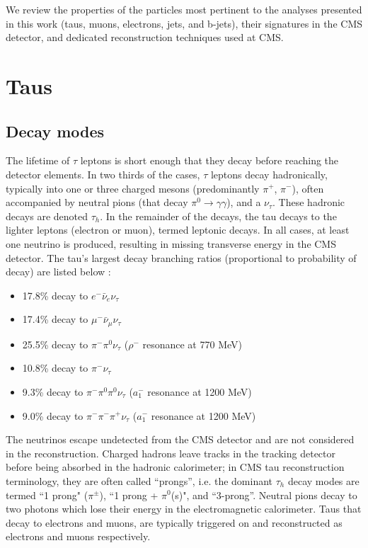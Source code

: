 We review the properties of the particles most pertinent to the analyses presented in this work (taus, muons, electrons, jets, and b-jets), their signatures in the CMS detector, and dedicated reconstruction techniques used at CMS.

\section{Taus}
\subsection{Decay modes}
The lifetime of $\tau$ leptons is short enough that they decay before reaching the detector elements. In two thirds of the cases, $\tau$ leptons decay hadronically, typically into one or three charged mesons (predominantly $\pi^+$, $\pi^-$), often accompanied by neutral pions (that decay $\pi^0 \rightarrow \gamma\gamma$), and a $\nu_{\tau}$. These hadronic decays are denoted $\tau_{h}$. In the remainder of the decays, the tau decays to the lighter leptons (electron or muon), termed leptonic decays. In all cases, at least one neutrino is produced, resulting in missing transverse energy in the CMS detector. The tau's largest decay branching ratios (proportional to probability of decay) are listed below \citep{workman_review_2022}: 
\begin{itemize}
    \item 17.8\% decay to $e^- \bar{\nu}_e \nu_{\tau}$
    \item 17.4\% decay to $\mu^- \bar{\nu}_\mu \nu_{\tau}$
    \item 25.5\% decay to $\pi^- \pi^0 \nu_{\tau}$ ($\rho^-$ resonance at 770 MeV)
    \item 10.8\% decay to $\pi^- \nu_{\tau}$ %
    \item 9.3\% decay to $\pi^- \pi^0 \pi^0 \nu_{\tau}$  ($a_1^-$ resonance at 1200 MeV)
    \item 9.0\% decay to $\pi^- \pi^- \pi^+ \nu_{\tau}$ ($a_1^-$ resonance at 1200 MeV)
\end{itemize}

The neutrinos escape undetected from the CMS detector and are not considered in the reconstruction. Charged hadrons leave tracks in the tracking detector before being absorbed in the hadronic calorimeter; in CMS tau reconstruction terminology, they are often called ``prongs'', i.e. the dominant $\tau_{h}$ decay modes are termed ``1 prong" ($\pi^\pm$), ``1 prong + $\pi^0$(s)", and ``3-prong''. Neutral pions decay to two photons which lose their energy in the electromagnetic calorimeter. Taus that decay to electrons and muons, are typically triggered on and reconstructed as electrons and muons respectively. 

